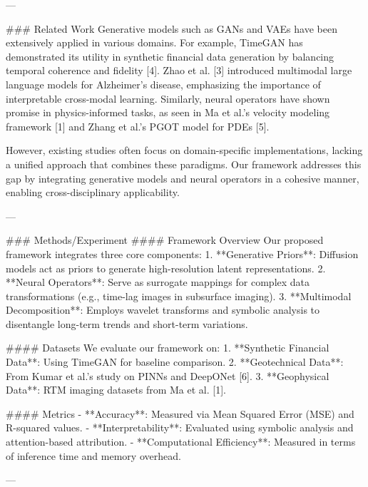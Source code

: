 ---

### Related Work  
Generative models such as GANs and VAEs have been extensively applied in various domains. For example, TimeGAN has demonstrated its utility in synthetic financial data generation by balancing temporal coherence and fidelity [4]. Zhao et al. [3] introduced multimodal large language models for Alzheimer's disease, emphasizing the importance of interpretable cross-modal learning. Similarly, neural operators have shown promise in physics-informed tasks, as seen in Ma et al.'s velocity modeling framework [1] and Zhang et al.'s PGOT model for PDEs [5].  

However, existing studies often focus on domain-specific implementations, lacking a unified approach that combines these paradigms. Our framework addresses this gap by integrating generative models and neural operators in a cohesive manner, enabling cross-disciplinary applicability.  

---

### Methods/Experiment  
#### Framework Overview  
Our proposed framework integrates three core components:  
1. **Generative Priors**: Diffusion models act as priors to generate high-resolution latent representations.  
2. **Neural Operators**: Serve as surrogate mappings for complex data transformations (e.g., time-lag images in subsurface imaging).  
3. **Multimodal Decomposition**: Employs wavelet transforms and symbolic analysis to disentangle long-term trends and short-term variations.  

#### Datasets  
We evaluate our framework on:  
1. **Synthetic Financial Data**: Using TimeGAN for baseline comparison.  
2. **Geotechnical Data**: From Kumar et al.'s study on PINNs and DeepONet [6].  
3. **Geophysical Data**: RTM imaging datasets from Ma et al. [1].  

#### Metrics  
- **Accuracy**: Measured via Mean Squared Error (MSE) and R-squared values.  
- **Interpretability**: Evaluated using symbolic analysis and attention-based attribution.  
- **Computational Efficiency**: Measured in terms of inference time and memory overhead.  

---

